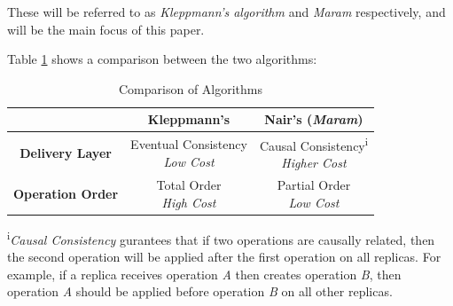 \documentclass[12pt]{report}
\begin{document}
\begin{itemize}
\end{itemize}

These will be referred to as \textit{Kleppmann's algorithm} and \textit{Maram} respectively, and will be the main focus of this paper.

Table \ref{table:differences} shows a comparison between the two algorithms:

\begin{table}[h]
    \def\arraystretch{2}
    \caption{Comparison of Algorithms} %
    \centering %
    \begin{tabular}{c c c} %
        \hline\hline %
                                & \textbf{Kleppmann's \cite{9563274}} & \textbf{Nair's (\textit{Maram}) \cite{https://doi.org/10.48550/arxiv.2103.04828}} \\ [0.5ex] %
        \hline %
        \textbf{Delivery Layer} & \makecell{Eventual Consistency                                                                                          \\ \textit{Low Cost}} & \makecell{Causal Consistency\textsuperscript{i}  \\ \textit{Higher Cost}}  \\ %
        \textbf{Operation Order}     & \makecell{Total Order                                                                                                   \\ \textit{High Cost}} & \makecell{Partial Order \\ \textit{Low Cost}}

        \\ [1ex] %
        \hline %
    \end{tabular}
    \label{table:differences} %
\end{table}

\textsuperscript{i}\textit{Causal Consistency} gurantees that if two operations are causally related, then the second operation will be applied after the first operation on all replicas. For example, if a replica receives operation \textit{A} then creates operation \textit{B}, then operation \textit{A} should be applied before operation \textit{B} on all other replicas. \par
\end{document}

